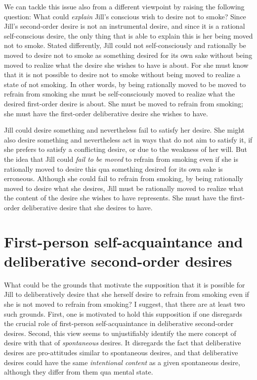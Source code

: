 \documentclass[output=paper,colorlinks,citecolor=brown
]{langscibook}
\begin{document}
We can tackle this issue also from a different viewpoint by raising the following question: What could \textit{explain} Jill’s conscious wish to desire not to smoke? Since Jill’s second-order desire is not an instrumental desire, and since it is a rational self-conscious desire, the only thing that is able to explain this is her being moved not to smoke. Stated differently, Jill could not self-consciously and rationally be moved to desire not to smoke as something desired for its own sake without being moved to realize what the desire she wishes to have is about. For she must know that it is not possible to desire not to smoke without being moved to realize a state of not smoking. In other words, by being rationally moved to be moved to refrain from smoking she must be self-consciously moved to realize what the desired first-order desire is about. She must be moved to refrain from smoking; she must have the first-order deliberative desire she wishes to have.

Jill could desire something and nevertheless fail to satisfy her desire. She might also desire something and nevertheless act in ways that do not aim to satisfy it, if she prefers to satisfy a conflicting desire, or due to the weakness of her will. But the idea that Jill could \textit{fail to be moved} to refrain from smoking even if she is rationally moved to desire this qua something desired for its own sake is erroneous. Although she could fail to refrain from smoking, by being rationally moved to desire what she desires, Jill must be rationally moved to realize what the content of the desire she wishes to have represents. She must have the first-order deliberative desire that she desires to have.

\section{First-person self-acquaintance and deliberative second-order desires}

What could be the grounds that motivate the supposition that it is possible for Jill to deliberatively desire that she herself desire to refrain from smoking even if she is not moved to refrain from smoking? I suggest, that there are at least two such grounds. First, one is motivated to hold this supposition if one disregards the crucial role of first-person self-acquaintance in deliberative second-order desires. Second, this view seems to unjustifiably identify the mere concept of desire with that of \textit{spontaneous} desires. It disregards the fact that deliberative desires are pro-attitudes similar to spontaneous desires, and that deliberative desires could have the same \textit{intentional content} as a given spontaneous desire, although they differ from them qua mental state. 
\end{document}
